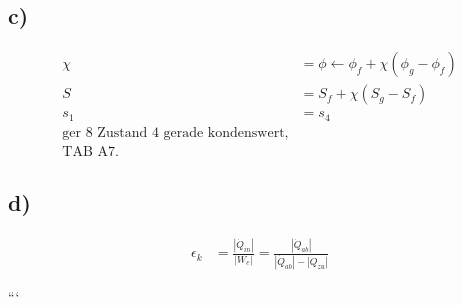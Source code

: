 \subsection*{c)}
\begin{align*}
\chi &= \phi \leftarrow \phi_f + \chi \left( \phi_g - \phi_f \right) \\
S &= S_f + \chi \left( S_g - S_f \right) \\
s_1 &= s_4 \\
\text{ger } 8 \text{ Zustand 4 gerade kondenswert,} \\
\text{TAB A7.}
\end{align*}

\subsection*{d)}
\begin{align*}
\epsilon_k &= \frac{\left| \dot{Q}_{in} \right|}{\left| W_e \right|} = \frac{\left| \dot{Q}_{ab} \right|}{\left| \dot{Q}_{ab} \right| - \left| Q_{zu} \right|}
\end{align*}

```
